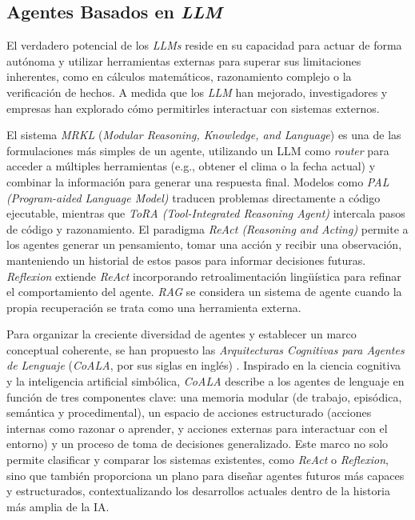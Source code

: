 \subsection{Agentes Basados en \textit{LLM}}
\label{subsec:agentes_llm}
El verdadero potencial de los \textit{LLMs} reside en su capacidad para actuar de forma autónoma y utilizar herramientas externas para superar sus limitaciones inherentes, como en cálculos matemáticos, razonamiento complejo o la verificación de hechos. A medida que los \textit{LLM} han mejorado, investigadores y empresas han explorado cómo permitirles interactuar con sistemas externos.

El sistema \textit{MRKL} (\textit{Modular Reasoning, Knowledge, and Language}) \parencite{karpasMRKLSystemsModular2022} es una de las formulaciones más simples de un agente, utilizando un LLM como \textit{router} para acceder a múltiples herramientas (e.g., obtener el clima o la fecha actual) y combinar la información para generar una respuesta final. Modelos como \textit{PAL (Program-aided Language Model)} \parencite{gaoPALProgramaidedLanguage2023} traducen problemas directamente a código ejecutable, mientras que \textit{ToRA (Tool-Integrated Reasoning Agent)} \parencite{gouToRAToolIntegratedReasoning2024} intercala pasos de código y razonamiento. El paradigma \textit{ReAct (Reasoning and Acting)} \parencite{yaoReActSynergizingReasoning2023} permite a los agentes generar un pensamiento, tomar una acción y recibir una observación, manteniendo un historial de estos pasos para informar decisiones futuras. \textit{Reflexion} \parencite{shinnReflexionLanguageAgents2023} extiende \textit{ReAct} incorporando retroalimentación lingüística para refinar el comportamiento del agente. \textit{RAG} se considera un sistema de agente cuando la propia recuperación se trata como una herramienta externa.

Para organizar la creciente diversidad de agentes y establecer un marco conceptual coherente, se han propuesto las \textit{Arquitecturas Cognitivas para Agentes de Lenguaje} (\textit{CoALA}, por sus siglas en inglés) \parencite{sumersCognitiveArchitecturesLanguage2024}. Inspirado en la ciencia cognitiva y la inteligencia artificial simbólica, \textit{CoALA} describe a los agentes de lenguaje en función de tres componentes clave: una memoria modular (de trabajo, episódica, semántica y procedimental), un espacio de acciones estructurado (acciones internas como razonar o aprender, y acciones externas para interactuar con el entorno) y un proceso de toma de decisiones generalizado. Este marco no solo permite clasificar y comparar los sistemas existentes, como \textit{ReAct} o \textit{Reflexion}, sino que también proporciona un plano para diseñar agentes futuros más capaces y estructurados, contextualizando los desarrollos actuales dentro de la historia más amplia de la IA.

